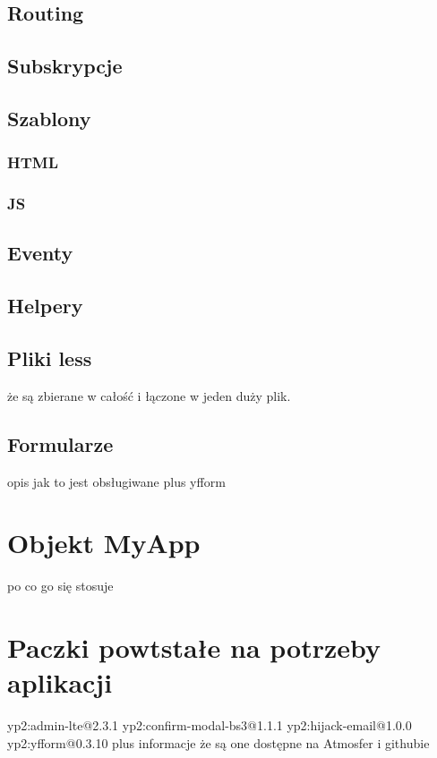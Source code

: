   \subsection{Routing}
  \subsection{Subskrypcje}
  \subsection{Szablony}
    \subsubsection{HTML}
    \subsubsection{JS}
  \subsection{Eventy}
  \subsection{Helpery}
  \subsection{Pliki less}
    że są zbierane w całość i łączone w jeden duży plik.
  \subsection{Formularze}
    opis jak to jest obsługiwane plus yfform
  
\section{Objekt MyApp}
  po co go się stosuje

  
\section{Paczki powtstałe na potrzeby aplikacji}
yp2:admin-lte@2.3.1
yp2:confirm-modal-bs3@1.1.1
yp2:hijack-email@1.0.0
yp2:yfform@0.3.10
plus informacje że są one dostępne na Atmosfer i githubie